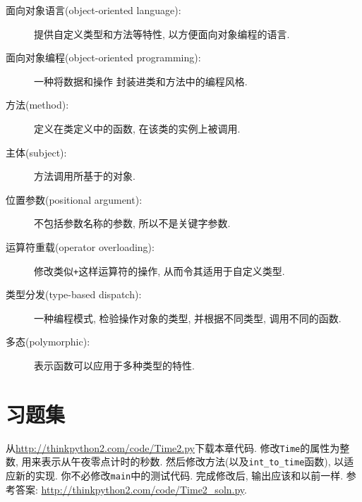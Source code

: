 \documentclass[10pt]{book}
\begin{document}
\begin{description}

\item[面向对象语言(object-oriented language):] 提供自定义类型和方法等特性, 
以方便面向对象编程的语言. 

\item[面向对象编程(object-oriented programming):] 
一种将数据和操作
封装进类和方法中的编程风格.

\item[方法(method):] 定义在类定义中的函数, 
在该类的实例上被调用. 

\item[主体(subject):] 方法调用所基于的对象. 

\item[位置参数(positional argument):] 不包括参数名称的参数, 
所以不是关键字参数. 

\item[运算符重载(operator overloading):] 修改类似{\tt +}这样运算符的操作, 
从而令其适用于自定义类型. 

\item[类型分发(type-based dispatch):] 一种编程模式, 检验操作对象的类型, 
并根据不同类型, 调用不同的函数. 

\item[多态(polymorphic):] 表示函数可以应用于多种类型的特性. 

\end{description}


\section{习题集}

\begin{exercise}

从\url{http://thinkpython2.com/code/Time2.py}下载本章代码. 
修改{\tt Time}的属性为整数, 用来表示从午夜零点计时的秒数. 
然后修改方法(以及\verb"int_to_time"函数), 以适应新的实现. 
你不必修改{\tt main}中的测试代码. 
完成修改后, 输出应该和以前一样. 
参考答案: \url{http://thinkpython2.com/code/Time2_soln.py}.

\end{exercise}
\end{document}
